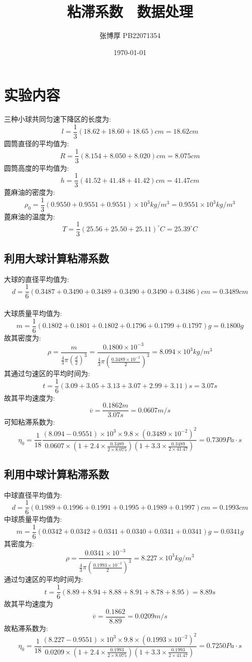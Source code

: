 \documentclass[12pt,a4paper,oneside]{ctexart}
\title{粘滞系数$\quad$数据处理}
\author{张博厚 PB22071354}
\date{\today}
\begin{document}
\maketitle
\newpage
\section{实验内容}
\noindent 
三种小球共同匀速下降区的长度为:
$$l=\dfrac{1}{3}(18.62+18.60+18.65)cm=18.62cm$$
圆筒直径的平均值为:
$$R=\dfrac{1}{3}(8.154+8.050+8.020)cm=8.075cm$$
圆筒高度的平均值为:
$$h=\dfrac{1}{3}(41.52+41.48+41.42)cm=41.47cm$$
蓖麻油的密度为:
$$\rho_0=\dfrac{1}{3}(0.9550+0.9551+0.9551)\times 10^3kg/m^3=0.9551\times 10^3kg/m^3$$
蓖麻油的温度为:
$$T=\dfrac{1}{3}(25.56+25.50+25.11)^{\circ}C=25.39^{\circ}C$$
\subsection{利用大球计算粘滞系数}
\noindent 大球的直径平均值为:
$$d=\frac{1}{6}(0.3487+0.3490+0.3489+0.3490+0.3490+0.3486)cm=0.3489cm$$\\
大球质量平均值为:
$$m=\frac{1}{6}(0.1802+0.1801+0.1802+0.1796+0.1799+0.1797)g=0.1800g$$
故其密度为:
$$\rho=\dfrac{m}{\frac{4}{3}\pi (\frac{d}{2})^3}=\dfrac{0.1800\times 10^{-3}}{\frac{4}{3}\pi(\frac{0.3489\times 10^{-2}}{2})^3}=8.094\times 10^3 kg/m^3$$
其通过匀速区的平均时间为:
$$t=\frac{1}{6}(3.09+3.05+3.13+3.07+2.99+3.11)s=3.07s$$
故其平均速度为:$$\overline{v}=\frac{0.1862m}{3.07s}=0.0607m/s$$
可知粘滞系数为:
\begin{equation*}
    \eta_0=\frac{1}{18}\frac{(8.094-0.9551)\times 10^3\times 9.8\times (0.3489\times 10^{-2})^2}
                            {0.0607\times(1+2.4\times\frac{0.3489}{2\times8.075})(1+3.3\times\frac{0.3489}{2\times 41.47})}
          =0.7309Pa\cdot s
\end{equation*}
\subsection{利用中球计算粘滞系数}
\noindent
中球直径平均值为:
$$d=\frac{1}{6}(0.1989+0.1996+0.1991+0.1995+0.1989+0.1997)cm=0.1993cm$$
中球质量平均值为:
$$m=\frac{1}{6}(0.0342+0.0342+0.0341+0.0340+0.0341+0.0341)g=0.0341g$$
其密度为:
$$\rho=\dfrac{0.0341\times 10^{-3}}{\frac{4}{3}\pi(\frac{0.1993\times 10^{-2}}{2})^3}=8.227\times10^3kg/m^3$$
通过匀速区的平均时间为:
$$t=\frac{1}{6}(8.89+8.94+8.88+8.91+8.78+8.95)=8.89s$$
故其平均速度为$$\overline{v}=\frac{0.1862}{8.89}=0.0209m/s$$
故粘滞系数为:
\begin{equation*}
    \eta_0=\frac{1}{18}\frac{(8.227-0.9551)\times10^3\times9.8\times(0.1993\times10^{-2})^2}
                            {0.0209\times(1+2.4\times\frac{0.1993}{2\times8.075})(1+3.3\times\frac{0.1993}{2\times41.47})}=0.7250Pa\cdot s
\end{equation*}
\end{document}
